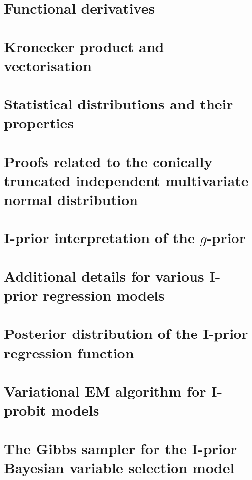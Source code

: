 \documentclass[a4paper,showframe,11pt]{report}
\begin{document}

\appendix

\chapter{Functional derivatives}


\chapter{Kronecker product and vectorisation}


\chapter{Statistical distributions and their properties}


\chapter{Proofs related to the conically truncated independent multivariate normal distribution}\label{apx:contrunproof}


\chapter{I-prior interpretation of the $g$-prior}\label{misc:gprior}


\chapter{Additional details for various I-prior regression models}


\afterpage{\blankpage}
\chapter{Posterior distribution of the I-prior regression function}


\chapter{Variational EM algorithm for I-probit models}


\chapter{The Gibbs sampler for the I-prior Bayesian variable selection model}\label{apx:gibbsbvs}

 
%

\hClosingStuffStandalone
\end{document}
